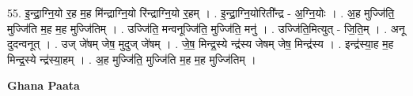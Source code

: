 \documentclass[17pt]{extarticle}
\begin{document}
55. इ॒न्द्रा॒ग्नि॒यो र॒ह म॒ह मि॑न्द्राग्नि॒यो रि॑न्द्राग्नि॒यो र॒हम् । . इ॒न्द्रा॒ग्नि॒योरिती᳚न्द्र - अ॒ग्नि॒योः । . अ॒ह मुज्जि॑ति॒ मुज्जि॑ति म॒ह म॒ह मुज्जि॑तिम् । . उज्जि॑ति॒ मन्वनूज्जि॑ति॒ मुज्जि॑ति॒ मनु॑ । . उज्जि॑ति॒मित्युत् - जि॒ति॒म् । . अनू दुदन्वनूत् । . उज् जे॑षम् जेष॒ मुदुज् जे॑षम् । . जे॒ष॒ मिन्द्र॒स्ये न्द्र॑स्य जेषम् जेष॒ मिन्द्र॑स्य । . इन्द्र॑स्या॒ह म॒ह मिन्द्र॒स्ये न्द्र॑स्या॒हम् । . अ॒ह मुज्जि॑ति॒ मुज्जि॑ति म॒ह म॒ह मुज्जि॑तिम् । \newline

\textbf{Ghana Paata } \newline
\end{document}
